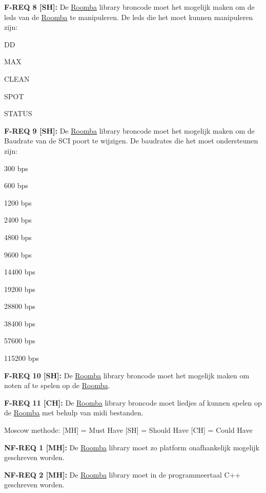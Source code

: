 {\bfseries{F-\/\+REQ 8 \mbox{[}SH\mbox{]}\+:}} De \mbox{\hyperlink{namespace_roomba}{Roomba}} library broncode moet het mogelijk maken om de leds van de \mbox{\hyperlink{namespace_roomba}{Roomba}} te manipuleren. De leds die het moet kunnen manipuleren zijn\+:
\begin{DoxyItemize}
\item DD
\item MAX
\item CLEAN
\item SPOT
\item STATUS
\end{DoxyItemize}

{\bfseries{F-\/\+REQ 9 \mbox{[}SH\mbox{]}\+:}} De \mbox{\hyperlink{namespace_roomba}{Roomba}} library broncode moet het mogelijk maken om de Baudrate van de SCI poort te wijzigen. De baudrates die het moet ondersteunen zijn\+:
\begin{DoxyItemize}
\item 300 bps
\item 600 bps
\item 1200 bps
\item 2400 bps
\item 4800 bps
\item 9600 bps
\item 14400 bps
\item 19200 bps
\item 28800 bps
\item 38400 bps
\item 57600 bps
\item 115200 bps
\end{DoxyItemize}

{\bfseries{F-\/\+REQ 10 \mbox{[}SH\mbox{]}\+:}} De \mbox{\hyperlink{namespace_roomba}{Roomba}} library broncode moet het mogelijk maken om noten af te spelen op de \mbox{\hyperlink{namespace_roomba}{Roomba}}.

{\bfseries{F-\/\+REQ 11 \mbox{[}CH\mbox{]}\+:}} De \mbox{\hyperlink{namespace_roomba}{Roomba}} library broncode moet liedjes af kunnen spelen op de \mbox{\hyperlink{namespace_roomba}{Roomba}} met behulp van midi bestanden.

Moscow methode\+: \mbox{[}MH\mbox{]} = Must Have \mbox{[}SH\mbox{]} = Should Have \mbox{[}CH\mbox{]} = Could Have

{\bfseries{NF-\/\+REQ 1 \mbox{[}MH\mbox{]}\+:}} De \mbox{\hyperlink{namespace_roomba}{Roomba}} library moet zo platform onafhankelijk mogelijk geschreven worden.

{\bfseries{NF-\/\+REQ 2 \mbox{[}MH\mbox{]}\+:}} De \mbox{\hyperlink{namespace_roomba}{Roomba}} library moet in de programmeertaal C++ geschreven worden. 
